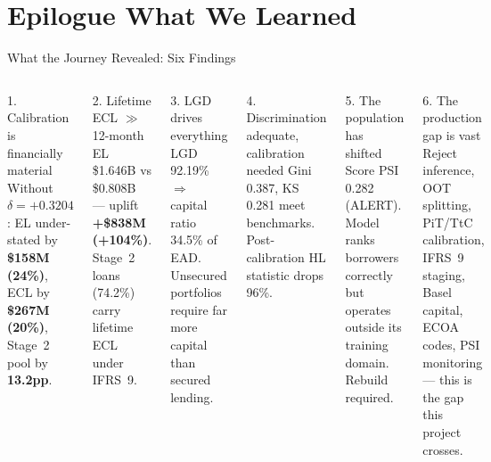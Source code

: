 \documentclass[aspectratio=169,11pt]{beamer}
\newcommand{\B}[1]{\textbf{#1}}
\begin{document}
\section{Epilogue \textemdash{} What We Learned}

\begin{frame}{What the Journey Revealed: Six Findings}
  \begin{columns}[T]
      \begin{block}{\small 1. Calibration is financially material}\footnotesize
        Without $\delta = +0.3204$: EL under-stated by \B{\$158M (24\%)}, ECL by \B{\$267M (20\%)}, Stage~2 pool by \B{13.2pp}.
      \end{block}
      \vspace{4pt}
      \begin{block}{\small 2. Lifetime ECL $\gg$ 12-month EL}\footnotesize
        \$1.646B vs \$0.808B --- uplift \B{+\$838M (+104\%)}. Stage~2 loans (74.2\%) carry lifetime ECL under IFRS~9.
      \end{block}
      \vspace{4pt}
      \begin{block}{\small 3. LGD drives everything}\footnotesize
        LGD 92.19\% $\Rightarrow$ capital ratio 34.5\% of EAD. Unsecured portfolios require far more capital than secured lending.
      \end{block}

      \begin{block}{\small 4. Discrimination adequate, calibration needed}\footnotesize
        Gini 0.387, KS 0.281 meet benchmarks. Post-calibration HL statistic drops 96\%.
      \end{block}
      \vspace{4pt}
      \begin{alertblock}{\small 5. The population has shifted}\footnotesize
        Score PSI 0.282 (ALERT). Model ranks borrowers correctly but operates outside its training domain. Rebuild required.
      \end{alertblock}
      \vspace{4pt}
      \begin{alertblock}{\small 6. The production gap is vast}\footnotesize
        Reject inference, OOT splitting, PiT/TtC calibration, IFRS~9 staging, Basel capital, ECOA codes, PSI monitoring --- this is the gap this project crosses.
      \end{alertblock}
  \end{columns}
\end{frame}
\end{document}
